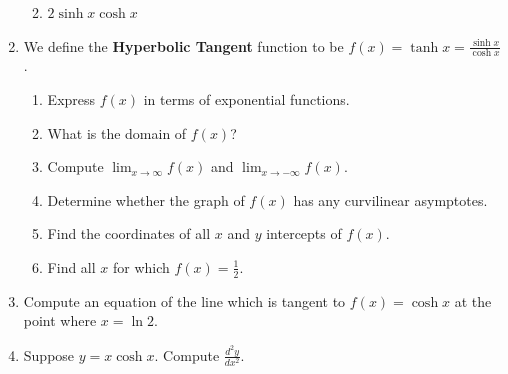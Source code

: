 \documentclass[12pt]{article}
\newif\ifans
\begin{document}
\begin{enumerate}
\begin{enumerate}
\ifans\fbox{$\sinh{2x}=\frac{e^{2x}-e^{-2x}}{2}$} \fi

\item $2\sinh{x}\cosh{x}$

\ifans\fbox{$2\sinh{x}\cosh{x}=2\left(\frac{e^x+e^{-x}}{2}\right)\left(\frac{e^x-e^{-x}}{2}\right)=\frac{e^{2x}-e^{-2x}}{2}$} \fi

\end{enumerate}

\item We define the {\bf Hyperbolic Tangent} function to be $f(x)=\tanh{x}=\frac{\sinh{x}}{\cosh{x}}$.

\begin{enumerate}

\item Express $f(x)$ in terms of exponential functions.

\ifans\fbox{$\tanh{x}=\frac{e^x-e^{-x}}{e^x+e^{-x}}$} \fi

\item What is the domain of $f(x)$?

\ifans\fbox{$(-\infty,\infty)$} \fi

\item Compute $\lim_{x\to\infty}f(x)$ and $\lim_{x\to-\infty}f(x)$.

\ifans\fbox{$\lim_{x\to\infty}f(x)=1$ and $\lim_{x\to-\infty}f(x)=-1$} \fi

\item Determine whether the graph of $f(x)$ has any curvilinear asymptotes.

\ifans\fbox{The graph has horizontal asymptotes $y=1$ and $y=-1$.} \fi

\item Find the coordinates of all $x$ and $y$ intercepts of $f(x)$.

\ifans{\fbox{$(0,0)$}} \fi

\item Find all $x$ for which $f(x)=\frac{1}{2}$.

\ifans\fbox{$\frac{1}{2}\ln{3}$} \fi

\end{enumerate}

\item Compute an equation of the line which is tangent to $f(x)=\cosh{x}$ at the point where $x=\ln{2}$.

\ifans\fbox{$y-\frac{5}{4}=\frac{3}{4}(x-\ln{2})$} \fi

\item Suppose $y=x\cosh{x}$.  Compute $\frac{d^2y}{dx^2}$.

\ifans\fbox{$\frac{d^2y}{dx^2}=2\sinh(x)+x\cosh(x)$} \fi

\end{enumerate}
\end{document}

